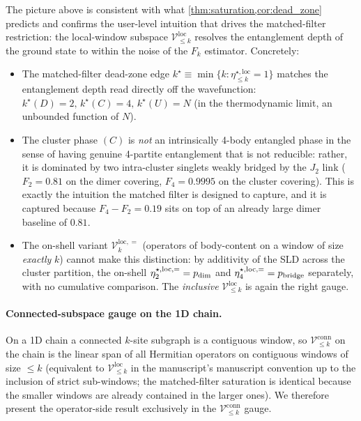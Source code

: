 \documentclass[11pt,a4paper]{article}
\newcommand{\Vconn}[1]{\mathcal{V}^{\mathrm{conn}}_{\le #1}}
\newcommand{\Vloc}[1]{\mathcal{V}^{\mathrm{loc}}_{\le #1}}
\newcommand{\etaloc}[1]{\eta^{\star,\mathrm{loc}}_{\le #1}}
\begin{document}
The picture above is consistent with what
\cref{thm:saturation,cor:dead_zone} predicts and confirms the
user-level intuition that drives the matched-filter restriction:
the local-window subspace $\Vloc{k}$ resolves the entanglement
depth of the ground state to within the noise of the
$F_k$ estimator.  Concretely:
\begin{itemize}[leftmargin=2em]
\item The matched-filter dead-zone edge
$k^\star\equiv\min\{k:\etaloc{k}=1\}$ matches the entanglement
depth read directly off the wavefunction:
$k^\star(D)=2,\,k^\star(C)=4,\,k^\star(U)=N$ (in the
thermodynamic limit, an unbounded function of $N$).
\item The cluster phase $(C)$ is \emph{not} an intrinsically
4-body entangled phase in the sense of having genuine 4-partite
entanglement that is not reducible: rather, it is dominated by
two intra-cluster singlets weakly bridged by the $J_2$ link
($F_2=0.81$ on the dimer covering, $F_4=0.9995$ on the cluster
covering).  This is exactly the intuition the matched filter is
designed to capture, and it is captured because $F_4-F_2=0.19$
sits on top of an already large dimer baseline of $0.81$.
\item The on-shell variant $\mathcal V^{\mathrm{loc},=}_{k}$ (operators of body-content
on a window of size \emph{exactly} $k$) cannot make this
distinction: by additivity of the SLD across the cluster
partition, the on-shell $\eta^{\star,{\rm loc},=}_{2}=p_{\rm dim}$
and $\eta^{\star,{\rm loc},=}_{4}=p_{\rm bridge}$ separately, with
no cumulative comparison.  The \emph{inclusive} $\Vloc{k}$ is
again the right gauge.
\end{itemize}

\paragraph{Connected-subspace gauge on the 1D chain.}  On a 1D
chain a connected $k$-site subgraph is a contiguous window, so
$\Vconn{k}$ on the chain is the linear span of all Hermitian
operators on contiguous windows of size $\le k$ (equivalent to
$\Vloc{k}$ in the manuscript's manuscript convention up to the
inclusion of strict sub-windows; the matched-filter saturation
is identical because the smaller windows are already contained
in the larger ones).  We therefore present the operator-side
result exclusively in the $\Vconn{k}$ gauge.
\end{document}
